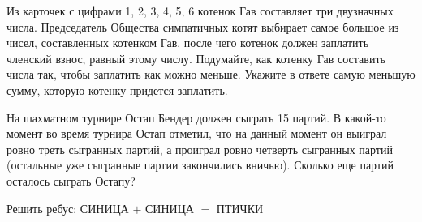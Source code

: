 \begin{class}[number=1]
\begin{listofex}
	\item Из карточек с цифрами 1, 2, 3, 4, 5, 6 котенок Гав составляет три двузначных числа.
	Председатель Общества симпатичных котят выбирает самое большое из чисел, составленных котенком Гав, после чего котенок должен заплатить членский взнос, равный
	этому числу. Подумайте, как котенку Гав составить числа так, чтобы заплатить как
	можно меньше. Укажите в ответе самую меньшую сумму, которую котенку придется заплатить.
	\item На шахматном турнире Остап Бендер должен сыграть 15 партий. В какой-то момент во время турнира Остап отметил, что на данный момент он выиграл ровно треть
	сыгранных партий, а проиграл ровно четверть сыгранных партий (остальные уже сыгранные партии закончились вничью). Сколько еще партий осталось сыграть Остапу?
	\item Решить ребус: СИНИЦА \( + \) СИНИЦА \( = \) ПТИЧКИ
\end{listofex}
\end{class}